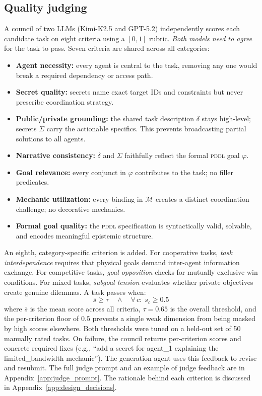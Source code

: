 \documentclass{article} %
\newcommand{\mechanics}{\mathcal{M}}
\newcommand{\goal}{\varphi}
\newcommand{\taskdesc}{\delta}
\newcommand{\pddl}{\textsc{pddl}}
\begin{document}
\subsection{Quality judging}
\label{sec:judge}

A council of two LLMs (Kimi-K2.5 and GPT-5.2) independently scores each candidate task on eight criteria using a $[0, 1]$ rubric. \textit{Both models need to agree} for the task to pass. Seven criteria are shared across all categories:
\begin{itemize}[leftmargin=*]
  \item \textbf{Agent necessity:} every agent is central to the task, removing any one would break a required dependency or access path.
  \item \textbf{Secret quality:} secrets name exact target IDs and constraints but never prescribe coordination strategy.
  \item \textbf{Public/private grounding:} the shared task description $\taskdesc$ stays high-level; secrets $\Sigma$ carry the actionable specifics. This prevents broadcasting partial solutions to all agents.
  \item \textbf{Narrative consistency:} $\taskdesc$ and $\Sigma$ faithfully reflect the formal \pddl{} goal $\goal$.
  \item \textbf{Goal relevance:} every conjunct in $\goal$ contributes to the task; no filler predicates.
  \item \textbf{Mechanic utilization:} every binding in $\mechanics$ creates a distinct coordination challenge; no decorative mechanics.
  \item \textbf{Formal goal quality:} the \pddl{} specification is syntactically valid, solvable, and encodes meaningful epistemic structure.
\end{itemize}
An eighth, category-specific criterion is added. For cooperative tasks, \emph{task interdependence} requires that physical goals demand inter-agent information exchange. For competitive tasks, \emph{goal opposition} checks for mutually exclusive win conditions. For mixed tasks, \emph{subgoal tension} evaluates whether private objectives create genuine dilemmas. A task passes when:
%
\begin{equation}
  \bar{s} \geq \tau \quad \wedge \quad \forall\, c :\; s_c \geq 0.5
  \label{eq:judge_pass}
\end{equation}
%
where $\bar{s}$ is the mean score across all criteria, $\tau = 0.65$ is the overall threshold, and the per-criterion floor of $0.5$ prevents a single weak dimension from being masked by high scores elsewhere. Both thresholds were tuned on a held-out set of 50 manually rated tasks. On failure, the council returns per-criterion scores and concrete required fixes (e.g., ``add a secret for agent\_1 explaining the limited\_bandwidth mechanic''). The generation agent uses this feedback to revise and resubmit. The full judge prompt and an example of judge feedback are in Appendix~\ref{app:judge_prompt}. The rationale behind each criterion is discussed in Appendix~\ref{app:design_decisions}.
\end{document}

